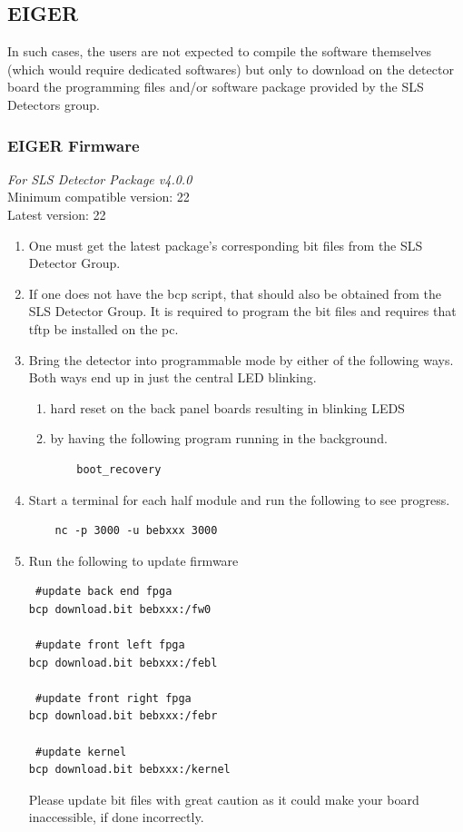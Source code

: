 \documentclass{article}
\begin{document}
\subsection{EIGER}

In such cases, the users are not expected to compile the software
themselves (which would require dedicated softwares) but only to download on the
detector board the programming files and/or software package provided by
the SLS Detectors group.

\subsubsection{EIGER Firmware}
\textit{For SLS Detector Package v4.0.0} \\
\indent Minimum compatible version:  22 \\
\indent Latest version:	22  \\


\begin{enumerate}
  \item One must get the latest package's corresponding bit files from the SLS
Detector Group.
  \item If one does not have the bcp script, that should also be obtained from
the SLS Detector Group. It is required to program the bit files and requires
that tftp be installed on the pc.
  \item Bring the detector into programmable mode by either of the following ways.
Both ways end up in just the central LED blinking.
  \begin{enumerate}
    \item hard reset on the back panel boards resulting in blinking LEDS 
    \item by having the following program running in the background. 
    \begin{verbatim}
    boot_recovery
    \end{verbatim}
\end{enumerate}
  \item Start a terminal for each half module and run the following to see 
progress.
\begin{verbatim}
	nc -p 3000 -u bebxxx 3000 
\end{verbatim}
  \item Run the following to update firmware
\begin{verbatim}
 #update back end fpga
bcp download.bit bebxxx:/fw0

 #update front left fpga
bcp download.bit bebxxx:/febl

 #update front right fpga
bcp download.bit bebxxx:/febr

 #update kernel
bcp download.bit bebxxx:/kernel
\end{verbatim}
Please update bit files with great caution as it could make your board
inaccessible, if done incorrectly.
\end{enumerate}
\end{document}

